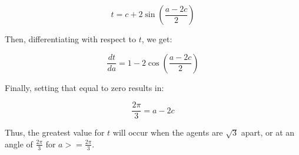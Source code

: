 \documentclass[11pt]{article}
\begin{document}
\begin{flushleft}
\[ t = c + 2 \sin (\frac{a - 2c}{2}) \]

\vspace*{5mm} Then, differentiating with respect to $t$, we get:

\[ \frac{dt}{da} = 1 - 2 \cos (\frac{a - 2c}{2}) \]

\vspace*{5mm} Finally, setting that equal to zero results in:

\[ \frac{2\pi}{3} = a - 2c \]

\vspace*{5mm} Thus, the greatest value for $t$ will occur when the agents are $\sqrt{3}$ apart,
or at an angle of $ \frac{2\pi}{3}$ for $a >= \frac{2\pi}{3}$.



\end{flushleft}
\end{document}
